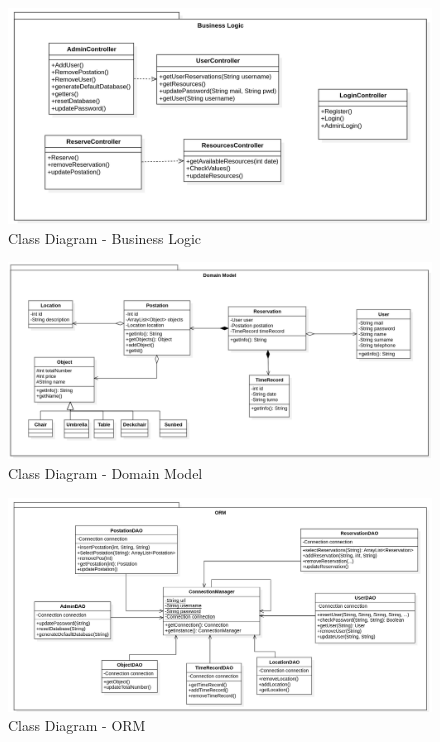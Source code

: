 \documentclass{article}
\begin{document}
            \begin{figure}[H]
                \centering
                \includegraphics[width=\textwidth]{Images/packages&diagrams/Business Logic.png}
                \caption{Class Diagram - Business Logic}
                \label{fig:business-logic-class-diagram}
            \end{figure}

            \clearpage

            \begin{figure}[H]
                \centering
                \includegraphics[width=\textwidth]{Images/packages&diagrams/Domain Model.png}
                \caption{Class Diagram - Domain Model}
                \label{fig:domain-model-class-diagram}
            \end{figure}

            \begin{figure}[H]
                \centering
                \includegraphics[width=\textwidth]{Images/packages&diagrams/ORM.png}
                \caption{Class Diagram - ORM}
                \label{fig:orm-class-diagram}
            \end{figure}
\clearpage
\end{document}
